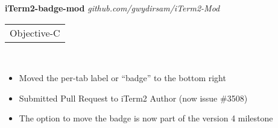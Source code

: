\documentclass[margin,line,12pt]{res}
\begin{document}
{\begin{resume}

{\bf iTerm2-badge-mod} {\em  github.com/gwydirsam/iTerm2-Mod}  \
\\
\begin{tabular}{l}
  Objective-C
\end{tabular}
\\
\vspace{-.10in}
\begin{itemize}
  \item Moved the per-tab label or ``badge'' to the bottom right
  \item Submitted Pull Request to iTerm2 Author (now issue \#3508)
  \item The option to move the badge is now part of the version 4 milestone
\end{itemize}




\end{resume}}
\end{document}
